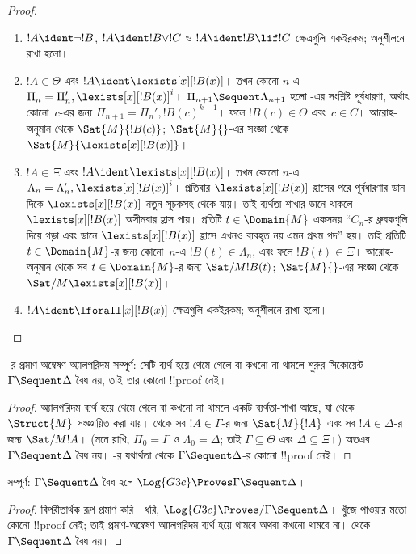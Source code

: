 \documentclass[../../../include/open-logic-section]{subfiles}
\begin{document}
\begin{proof}
\begin{enumerate}
  \item $!A \ident \lnot !B$,
  $!A \ident !B \lor !C$
  ও $!A \ident !B \lif !C$
  ক্ষেত্রগুলি একইরকম;
  অনুশীলনে রাখা হলো।

  \item $!A \in \Theta$
  এবং $!A \ident \lexists[x][!B(x)]$।
  তখন কোনো $n$-এ
  $\Pi_n = \Pi_n', \lexists[x][!B(x)]^i$।
  $\Pi_{n+1}
  \Sequent \Lambda_{n+1}$
  হলো \LeftR{\lexists}-এর
  সংশ্লিষ্ট পূর্বধারণা,
  অর্থাৎ কোনো~$c$-এর জন্য
  $\Pi_{n+1} = \Pi_n', !B(c)^{k+1}$।
  ফলে $!B(c) \in \Theta$
  এবং~$c \in C$।
  আরোহ-অনুমান থেকে
  $\Sat{M}{!B(c)}$;
  $\Sat{M}{}$-এর সংজ্ঞা থেকে
  $\Sat{M}{\lexists[x][!B(x)]}$।

  \item $!A \in \Xi$
  এবং $!A \ident \lexists[x][!B(x)]$।
  তখন কোনো $n$-এ
  $\Lambda_n = \Lambda_n', \lexists[x][!B(x)]^i$।
  প্রতিবার $\lexists[x][!B(x)]$
  হ্রাসের পরে পূর্বধারণার
  ডান দিকে $\lexists[x][!B(x)]$
  নতুন সূচকসহ
  থেকে যায়। তাই ব্যর্থতা-শাখার
  ডানে থাকলে
  $\lexists[x][!B(x)]$
  অসীমবার হ্রাস পায়।
  প্রতিটি $t \in
  \Domain{M}$ একসময়
  ``$C_n$-র ধ্রুবকগুলি
  দিয়ে গড়া এবং
  ডানে $\lexists[x][!B(x)]$
  হ্রাসে এখনও ব্যবহৃত নয়
  এমন প্রথম পদ'' হয়।
  তাই প্রতিটি $t \in \Domain{M}$-র
  জন্য কোনো~$n$-এ
  $!B(t) \in \Lambda_n$,
  এবং ফলে $!B(t) \in \Xi$।
  আরোহ-অনুমান থেকে
  সব $t \in \Domain{M}$-র
  জন্য $\Sat/{M}{!B(t)}$;
  $\Sat{M}{}$-এর সংজ্ঞা থেকে
  $\Sat/{M}{\lexists[x][!B(x)]}$।

  \item $!A \ident \lforall[x][!B(x)]$
  ক্ষেত্রগুলি একইরকম;
  অনুশীলনে রাখা হলো।
\end{enumerate}
\end{proof}

\begin{cor}
-র প্রমাণ-অন্বেষণ
অ্যালগরিদম সম্পূর্ণ:
সেটি ব্যর্থ হয়ে থেমে গেলে
বা কখনো না থামলে শুরুর
সিকোয়েন্ট~$\Gamma \Sequent \Delta$
বৈধ নয়, তাই তার কোনো
!!{proof} নেই।
\end{cor}

\begin{proof}
  অ্যালগরিদম ব্যর্থ হয়ে
  থেমে গেলে বা কখনো
  না থামলে একটি
  ব্যর্থতা-শাখা আছে,
  যা থেকে $\Struct{M}$
  সংজ্ঞায়িত করা যায়।
   থেকে
  সব $!A \in \Gamma$-র
  জন্য $\Sat{M}{!A}$
  এবং সব $!A \in \Delta$-র
  জন্য $\Sat/{M}{!A}$।
  (মনে রাখি,
  $\Pi_0 = \Gamma$ ও
  $\Lambda_0 =
  \Delta$; তাই
  $\Gamma \subseteq \Theta$
  এবং $\Delta \subseteq \Xi$।)
  অতএব $\Gamma \Sequent \Delta$
  বৈধ নয়। -র
  যথার্থতা থেকে
  $\Gamma \Sequent \Delta$-র
  কোনো !!{proof} নেই।
\end{proof}

\begin{cor}
 সম্পূর্ণ:
$\Gamma \Sequent \Delta$
বৈধ হলে
$\Log{G3c} \Proves
\Gamma \Sequent \Delta$।
\end{cor}

\begin{proof}
  বিপরীতার্থক রূপ প্রমাণ করি।
  ধরি, $\Log{G3c} \Proves/
  \Gamma \Sequent \Delta$।
  খুঁজে পাওয়ার মতো
  কোনো !!{proof} নেই;
  তাই প্রমাণ-অন্বেষণ
  অ্যালগরিদম ব্যর্থ হয়ে
  থামবে অথবা কখনো থামবে না।
   থেকে
  $\Gamma \Sequent \Delta$
  বৈধ নয়।
\end{proof}
\end{document}
